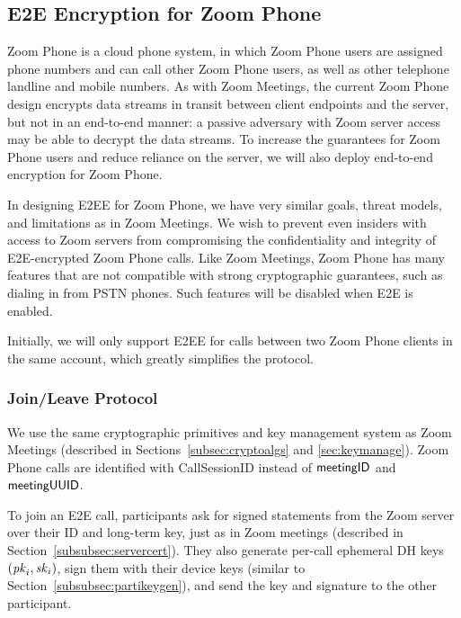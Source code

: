 \subsection{E2E Encryption for Zoom Phone}\label{subsec:phone}

Zoom Phone is a cloud phone system, in which Zoom Phone users are assigned phone numbers and can call other Zoom Phone users, as well as other telephone landline and mobile numbers. As with Zoom Meetings, the current Zoom Phone design encrypts data streams in transit between client endpoints and the server, but not in an end-to-end manner: a passive adversary with Zoom server access may be able to decrypt the data streams. To increase the guarantees for Zoom Phone users and reduce reliance on the server, we will also deploy end-to-end encryption for Zoom Phone.

In designing E2EE for Zoom Phone, we have very similar goals, threat models, and limitations as in Zoom Meetings. We wish to prevent even insiders with access to Zoom servers from compromising the confidentiality and integrity of E2E-encrypted Zoom Phone calls. Like Zoom Meetings, Zoom Phone has many features that are not compatible with strong cryptographic guarantees, such as dialing in from PSTN phones. Such features will be disabled when E2E is enabled.

Initially, we will only support E2EE for calls between two Zoom Phone clients in the same account, which greatly simplifies the protocol.

\subsubsection{Join/Leave Protocol}

We use the same \sodium{} cryptographic primitives and key management system as Zoom Meetings (described in Sections~\ref{subsec:cryptoalgs} and \ref{sec:keymanage}).
Zoom Phone calls are identified with {\sf CallSessionID} instead of ${\sf meetingID}$ and ${\sf meetingUUID}$.

To join an E2E call, participants ask for signed statements from the Zoom server over their ID and long-term key, just as in Zoom meetings (described in Section~\ref{subsubsec:servercert}). They also generate per-call ephemeral DH keys $(\mathit{pk}_i, \mathit{sk}_i)$, sign them with their device keys (similar to Section~\ref{subsubsec:partikeygen}), and send the key and signature to the other participant.

